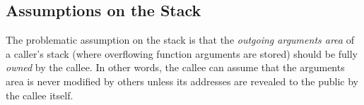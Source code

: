

\subsection{Assumptions on the Stack}
\label{sec:overview-semantics-memory}
%
The problematic assumption on the stack is that the
\emph{outgoing arguments area} of a caller's stack (\ie where overflowing function
arguments are stored) should be fully \emph{owned} by the callee. In
other words, the callee can assume that the arguments area is never
modified by others unless its addresses are revealed to the public by
the callee itself.

